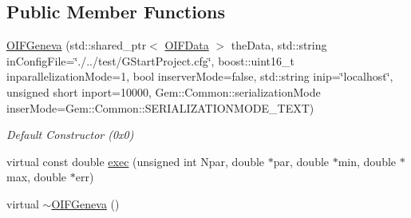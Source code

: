 \subsection*{Public Member Functions}
\begin{DoxyCompactItemize}
\item 
\hyperlink{classOIFGeneva_ab0725fff35e64106d69979527715f674}{OIFGeneva} (std::shared\_\-ptr$<$ \hyperlink{classOIFData}{OIFData} $>$ theData, std::string inConfigFile=\char`\"{}./../test/GStartProject.cfg\char`\"{}, boost::uint16\_\-t inparallelizationMode=1, bool inserverMode=false, std::string inip=\char`\"{}localhost\char`\"{}, unsigned short inport=10000, Gem::Common::serializationMode inserMode=Gem::Common::SERIALIZATIONMODE\_\-TEXT)
\begin{DoxyCompactList}\small\item\em Default Constructor (0x0) \end{DoxyCompactList}\item 
virtual const double \hyperlink{classOIFGeneva_a1a5cf2ace477bd40ce1c4848365a2f13}{exec} (unsigned int Npar, double $\ast$par, double $\ast$min, double $\ast$max, double $\ast$err)
\item 
virtual \hyperlink{classOIFGeneva_a72a8b0d30f8ef7d1d7dbe51a15a412e3}{$\sim$OIFGeneva} ()
\end{DoxyCompactItemize}

